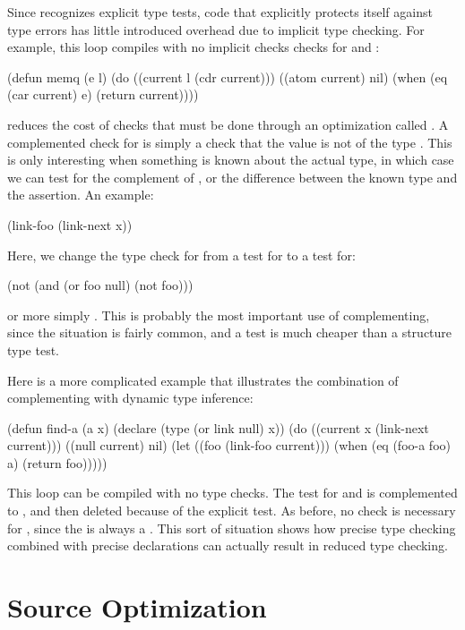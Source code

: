 Since \python{} recognizes explicit type tests, code that explicitly
protects itself against type errors has little introduced overhead due
to implicit type checking.  For example, this loop compiles with no
implicit checks checks for  and :
\begin{lisp}
(defun memq (e l)
  (do ((current l (cdr current)))
      ((atom current) nil)
    (when (eq (car current) e) (return current))))
\end{lisp}

\python{} reduces the cost of checks that must be done through an
optimization called .  A complemented check for
 is simply a check that the value is not of the type
.  This is only interesting when something
is known about the actual type, in which case we can test for the
complement of , or
the difference between the known type and the assertion.  An example:
\begin{lisp}
(link-foo (link-next x))
\end{lisp}
Here, we change the type check for  from a test for
 to a test for:
\begin{lisp}
(not (and (or foo null) (not foo)))
\end{lisp}
or more simply .  This is probably the most
important use of complementing, since the situation is fairly common,
and a  test is much cheaper than a structure type test.

Here is a more complicated example that illustrates the combination of
complementing with dynamic type inference:
\begin{lisp}
(defun find-a (a x)
  (declare (type (or link null) x))
  (do ((current x (link-next current)))
      ((null current) nil)
    (let ((foo (link-foo current)))
      (when (eq (foo-a foo) a) (return foo)))))
\end{lisp}
This loop can be compiled with no type checks.  The  test
for  and  is complemented to
, and then deleted because of the explicit
 test.  As before, no check is necessary for ,
since the  is always a .  This sort of
situation shows how precise type checking combined with precise
declarations can actually result in reduced type checking.


\section{Source Optimization}
\label{source-optimization}

